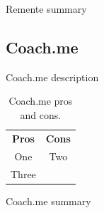 Remente summary


\subsection{Coach.me}\label{subsec:coachme}

Coach.me description

\begin{table}[h!]
    \centering
    \begin{ctucolortab}
        \begin{tabular}{cc}
            \bfseries Pros & \bfseries Cons\\\Midrule
            One & Two\\
            Three & \\
        \end{tabular}
    \end{ctucolortab}
    \caption{Coach.me pros and cons.}\label{tab:coachme-pros-cons}
\end{table}

Coach.me summary

